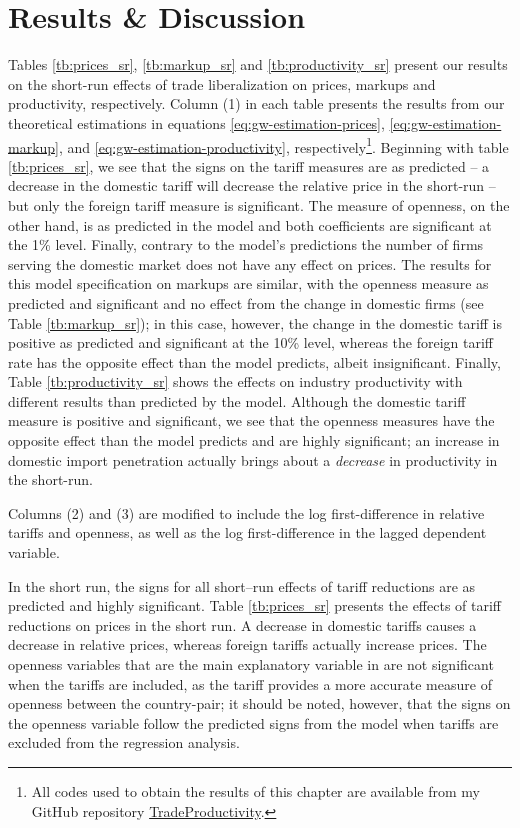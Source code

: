 \section{Results \& Discussion}\label{sec:disc4}
Tables \ref{tb:prices_sr}, \ref{tb:markup_sr} and \ref{tb:productivity_sr} present 
our results on the short-run effects of trade liberalization on prices, markups 
and productivity, respectively. Column (1) in each table presents the results from 
our theoretical estimations in equations \ref{eq:gw-estimation-prices}, 
\ref{eq:gw-estimation-markup}, and \ref{eq:gw-estimation-productivity}, 
respectively\footnote{All codes used to obtain the results of this chapter are 
available from my GitHub repository 
\href{https://github.com/nilshg/TradeProductivity}{TradeProductivity}.}. 
Beginning with table \ref{tb:prices_sr}, we see that the signs on the tariff 
measures are as predicted -- a decrease in the domestic tariff will decrease the 
relative price in the short-run -- but only the foreign tariff measure is significant. 
The measure of openness, on the other hand, is as predicted in the model and both coefficients are significant at the 1\% level. Finally, contrary to the model's predictions the number of firms serving the domestic market does not have any effect on prices. The results for this model specification on markups are similar, with the openness measure as predicted and significant and no effect from the change in domestic firms (see Table \ref{tb:markup_sr}); in this case, however, the change in the domestic tariff is positive as predicted and significant at the 10\% level, whereas the foreign tariff rate has the opposite effect than the model predicts, albeit insignificant. Finally, Table \ref{tb:productivity_sr} shows the effects on industry productivity with different results than predicted by the model. Although the domestic tariff measure is positive and significant, we see that the openness measures have the opposite effect than the model predicts and are highly significant; an increase in domestic import penetration actually brings about a \textit{decrease} in productivity in the short-run.

Columns (2) and (3) are modified to include the log first-difference in relative tariffs and openness, as well as the log first-difference in the lagged dependent variable.

In the short run, the signs for all short--run effects of tariff reductions are as predicted and highly significant. Table \ref{tb:prices_sr} presents the effects of tariff reductions on prices in the short run. A decrease in domestic tariffs causes a decrease in relative prices, whereas foreign tariffs actually increase prices. The openness variables that are the main explanatory variable in \citet{Chen2009} are not significant when the tariffs are included, as the tariff provides a more accurate measure of openness between the country-pair; it should be noted, however, that the signs on the openness variable follow the predicted signs from the model when tariffs are excluded from the regression analysis. 

